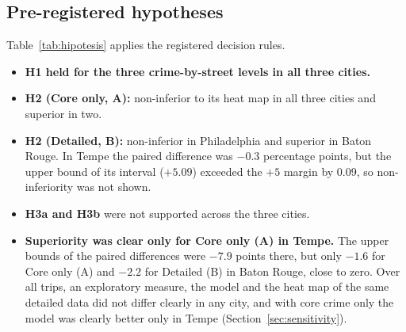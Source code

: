 \documentclass[preprint,12pt,authoryear]{elsarticle}
\newcommand{\ajustar}[1]{\adjustbox{max width=\textwidth}{#1}}
\begin{document}
\subsection{Pre-registered hypotheses}
Table~\ref{tab:hipotesis} applies the registered decision rules.
\begin{itemize}
  \item \textbf{H1 held for the three crime-by-street levels in all three cities.}
  \item \textbf{H2 (Core only, A):} non-inferior to its heat map in all three cities and superior in two.
  \item \textbf{H2 (Detailed, B):} non-inferior in Philadelphia and superior in Baton Rouge. In Tempe the paired difference was $-0.3$ percentage points, but the upper bound of its interval ($+5.09$) exceeded the $+5$ margin by 0.09, so non-inferiority was not shown.
  \item \textbf{H3a and H3b} were not supported across the three cities.
  \item \textbf{Superiority was clear only for Core only (A) in Tempe.} The upper bounds of the paired differences were $-7.9$ points there, but only $-1.6$ for Core only (A) and $-2.2$ for Detailed (B) in Baton Rouge, close to zero. Over all trips, an exploratory measure, the model and the heat map of the same detailed data did not differ clearly in any city, and with core crime only the model was clearly better only in Tempe (Section~\ref{sec:sensitivity}).
\end{itemize}

\begin{table}[htbp]
\centering\small
\caption{Pre-registered hypotheses. Cells give the verdict and, in parentheses, the upper bound of the relevant 95\% CI: the route change in \% (H1, H3a) or the paired difference in percentage points (H2, H3b; non-inferiority margin $+5$). Philadelphia and Baton Rouge come from the main exam; Tempe from the replacement exam (Section~\ref{sec:deviations}).}
\label{tab:hipotesis}
\ajustar{}
\end{table}
\end{document}
